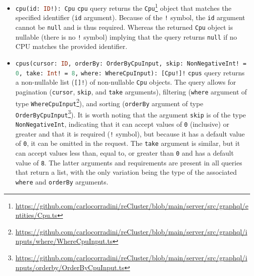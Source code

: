 \begin{itemize}
  \item \lstinline[language=graphql, morekeywords={[2]{Cpu}}, morekeywords={[4]{id}},
    morekeywords={[5]{cpu}}]{cpu(id: ID!): Cpu}
    \newline
    \texttt{cpu} query returns the \texttt{Cpu}\footnote{\url{https://github.com/carlocorradini/reCluster/blob/main/server/src/graphql/entities/Cpu.ts}}
    object that matches the specified identifier (\texttt{id} argument).
    \newline
    Because of the \texttt{!} symbol, the \texttt{id} argument cannot be \texttt{null}
    and is thus required. Whereas the returned \texttt{Cpu} object is nullable (there
    is no \texttt{!} symbol) implying that the query returns \texttt{null} if no
    CPU matches the provided identifier.

  \item \lstinline[language=graphql, morekeywords={[2]{Cpu, OrderByCpuInput, NonNegativeInt, WhereCpuInput}},
    morekeywords={[4]{cursor, orderBy, skip, take, where}}, morekeywords={[5]{cpus}}]{cpus(cursor: ID, orderBy: OrderByCpuInput, skip: NonNegativeInt! = 0, take: Int! = 8,}
    \newline
    \hphantom{---------}\lstinline[language=graphql, morekeywords={[2]{Cpu, OrderByCpuInput, NonNegativeInt, WhereCpuInput}},
    morekeywords={[4]{cursor, orderBy, skip, take, where}}, morekeywords={[5]{cpus}}]{where: WhereCpuInput): [Cpu!]!}
    \newline
    \texttt{cpus} query returns a non-nullable list (\texttt{[]!}) of non-nullable
    \texttt{Cpu} objects.
    \newline
    The query allows for pagination (\texttt{cursor}, \texttt{skip}, and \texttt{take}
    arguments), filtering (\texttt{where} argument of type \texttt{WhereCpuInput}\footnote{\url{https://github.com/carlocorradini/reCluster/blob/main/server/src/graphql/inputs/where/WhereCpuInput.ts}}),
    and sorting (\texttt{orderBy} argument of type \texttt{OrderByCpuInput}\footnote{\url{https://github.com/carlocorradini/reCluster/blob/main/server/src/graphql/inputs/orderby/OrderByCpuInput.ts}}).
    It is worth noting that the argument \texttt{skip} is of the type \texttt{NonNegativeInt},
    indicating that it can accept values of \texttt{0} (inclusive) or greater
    and that it is required (\texttt{!} symbol), but because it has a default
    value of \texttt{0}, it can be omitted in the request. The \texttt{take}
    argument is similar, but it can accept values less than, equal to, or greater
    than \texttt{0} and has a default value of \texttt{8}. The latter arguments
    and requirements are present in all queries that return a list, with the only
    variation being the type of the associated \texttt{where} and \texttt{orderBy}
    arguments.


\end{itemize}
